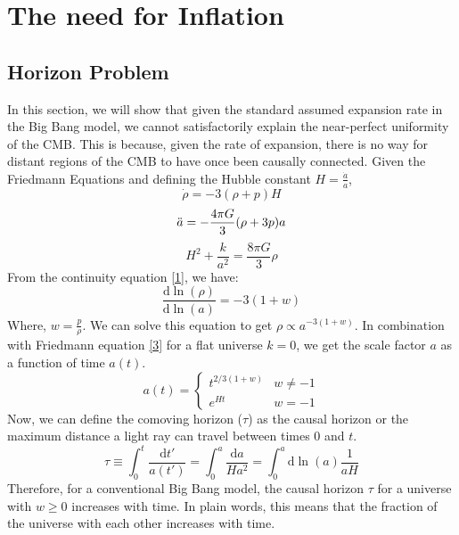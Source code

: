 \documentclass[aps,prd,reprint,preprintnumbers,showpacs,floatfix,nofootinbib,superscript address]{revtex4-2}
\begin{document}
\section{The need for Inflation}\label{The need for Inflation}
\subsection{Horizon Problem}
In this section, we will show that given the standard assumed expansion rate in the Big Bang model, we cannot satisfactorily explain the near-perfect uniformity of the CMB. This is because, given the rate of expansion, there is no way for distant regions of the CMB to have once been causally connected.
Given the Friedmann Equations and defining the Hubble constant $H = \frac{\dot{a}}{a}$,
\begin{equation} \label{1}
    \dot{\rho} = -3(\rho + p)H
\end{equation}
\begin{equation} \label{2}
    \Ddot{a} = -\frac{4\pi G}{3} (\rho + 3p)a
\end{equation}
\begin{equation}    \label{3}
    H^2 + \frac{k}{a^2} = \frac{8 \pi G}{3} \rho
\end{equation}
From the continuity equation \ref{1}, we have:
\begin{equation} \label{4}
    \frac{\mathrm{d}  \ln(\rho)}{\mathrm{d} \ln(a)} = -3(1+w)
\end{equation}
Where, $w = \frac{p}{\rho}$. We can solve this equation to get $\rho \propto a^{-3(1+w)}$. In combination with Friedmann equation \ref{3} for a flat universe $k = 0$, we get the scale factor $a$ as a function of time $a(t)$.
\begin{equation}    \label{5}
    a(t) = \begin{cases}
        t^{2/3(1+w)} & w \neq -1 \\
        e^{Ht} & w = -1
    \end{cases}
\end{equation}
Now, we can define the comoving horizon ($\tau$) as the causal horizon or the maximum distance a light ray can travel between times 0 and $t$.
\begin{equation}    \label{6}
    \tau \equiv \int_{0}^{t} \frac{\mathrm{d} t'}{a(t')} = \int_{0}^{a} \frac{\mathrm{d}a}{H a^2} = \int_{0}^{a} \mathrm{d} \ln(a) \frac{1}{aH}
\end{equation}
Therefore, for a conventional Big Bang model, the causal horizon $\tau$ for a universe with $w \geq 0$ increases with time. In plain words, this means that the fraction of the universe with each other increases with time.
\end{document}

